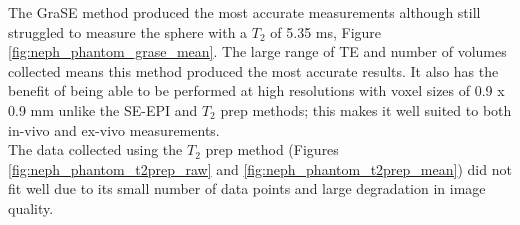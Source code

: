 The \ac{GraSE} method produced the most accurate measurements although still struggled to measure the sphere with a $T_2$ of 5.35 ms, Figure \ref{fig:neph_phantom_grase_mean}. The large range of \ac{TE} and number of volumes collected means this method produced the most accurate results. It also has the benefit of being able to be performed at high resolutions with voxel sizes of 0.9 x 0.9 mm unlike the \ac{SE}-\ac{EPI} and $T_2$ prep methods; this makes it well suited to both in-vivo and ex-vivo measurements.\\

The data collected using the $T_2$ prep method (Figures \ref{fig:neph_phantom_t2prep_raw} and \ref{fig:neph_phantom_t2prep_mean}) did not fit well due to its small number of data points and large degradation in image quality.\\

